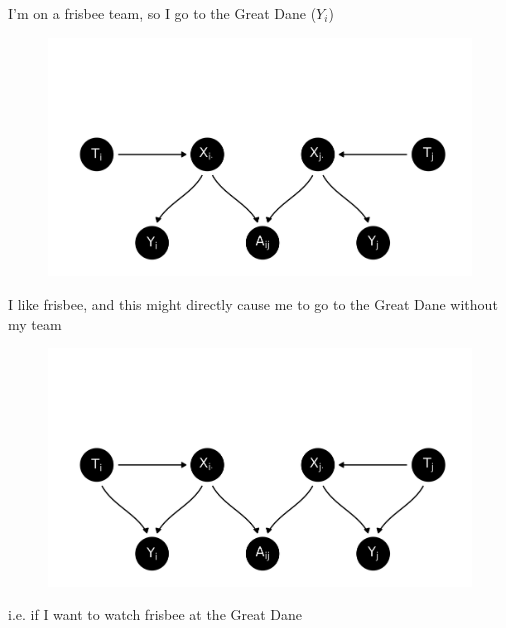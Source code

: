 \documentclass{beamer}
\theoremstyle{remark}
\begin{document}
\begin{frame}{I'm on a frisbee team, so I go to the Great Dane ($Y_i$)}

    \centering

    \begin{figure}
        \includegraphics[scale=0.65]{figures/dags/mediating-3.png}
        \label{fig:mediating-3}
    \end{figure}

\end{frame}

\begin{frame}{I like frisbee, and this might directly cause me to go to the Great Dane without my team}

    \centering

    \begin{figure}
        \includegraphics[scale=0.65]{figures/dags/mediating-4.png}
        \label{fig:mediating-4}
    \end{figure}

    i.e. if I want to watch frisbee at the Great Dane

\end{frame}
\end{document}
